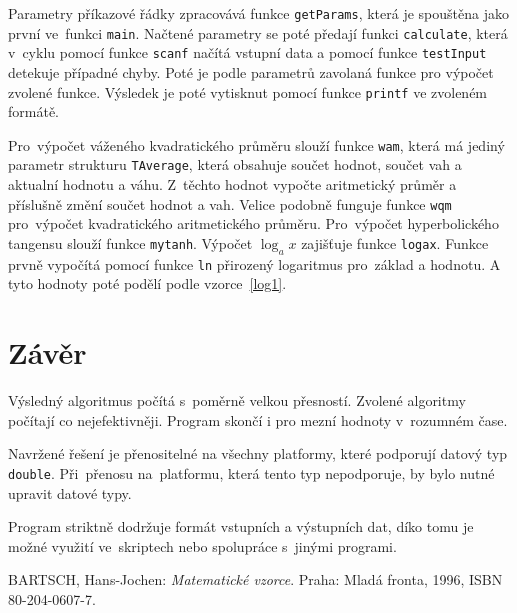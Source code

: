 \documentclass[12pt,a4paper,titlepage,final]{article}
\begin{document}
Parametry příkazové řádky zpracovává funkce \texttt{getParams}, která je
spouštěna jako první ve~funk\-ci \texttt{main}. Načtené parametry se poté
předají funkci \texttt{calculate}, která v~cyklu pomocí funkce \texttt{scanf}
načítá vstupní data a pomocí funkce \texttt{testInput} detekuje případné chyby.
Poté je podle parametrů zavolaná funkce pro výpočet zvolené funkce. Výsledek
je poté vytisknut pomocí funkce \texttt{printf} ve zvoleném formátě.

Pro~výpočet váženého kvadratického průměru slouží funkce \texttt{wam}, která má jediný
parametr strukturu \texttt{TAverage}, která obsahuje součet hodnot, součet vah a aktualní hodnotu a váhu.
Z~těchto hodnot vypočte aritmetický průměr a příslušně změní součet hodnot a vah.
Velice podobně funguje funkce \texttt{wqm} pro~výpočet kvadratického aritmetického průměru.
Pro~výpočet hyperbolického tangensu slouží funkce \texttt{mytanh}.
Výpočet $\log_{a}x$ zajišťuje funkce \texttt{logax}. Funkce prvně vypočítá 
pomocí funkce \texttt{ln} přirozený logaritmus pro~základ a hodnotu. A tyto hodnoty
poté podělí podle vzorce~\ref{log1}. 

\section{Závěr} \label{zaver}
Výsledný algoritmus počítá s~poměrně velkou přesností. Zvolené algoritmy
počítají co nejefektivněji. Program skončí i pro mezní hodnoty
v~rozumném čase.

Navržené řešení je přenositelné na všechny platformy, které podporují
datový typ \texttt{double}. Při~přenosu na~platformu, která tento typ nepodporuje,
by bylo nutné upravit datové typy.

Program striktně dodržuje formát vstupních a výstupních dat, díko tomu je možné
využití ve~skriptech nebo spolupráce s~jinými programi.


\begin{thebibliography}{1}

BARTSCH, Hans-Jochen: \emph{Matematické vzorce}. Praha: Mladá fronta, 1996, ISBN 80-204-0607-7.


\end{thebibliography}
\appendix
\end{document}
